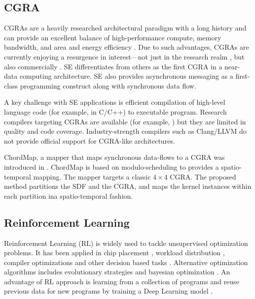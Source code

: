 \subsection{CGRA}
CGRAs are a heavily researched architectural paradigm with a long history and can provide an excellent balance of high-performance compute, memory bandwidth, and area and energy efficiency \cite{theodoridis2007survey}.
Due to such advantages, CGRAs are currently enjoying a resurgence in interest—not just in the research realm \cite{prabhakar2018plasticine}, but also commercially \cite{morgan2018intel, nicol2017coarse, vissers2019versal}.
SE differentiates from others as the first CGRA in a near-data computing architecture.
SE also provides asynchronous messaging as a first-class programming construct along with synchronous data flow. 

A key challenge with SE applications is efficient compilation of high-level language code (for example, in C/C++) to executable program. 
Research compilers targeting CGRAs are available (for example, \cite{adriaansen2016code, chin2017cgra, mei2003exploiting, prabhakar2018plasticine}) but they are limited in quality and code coverage. 
Industry-strength compilers such as Clang/LLVM do not provide official support for CGRA-like architectures.

ChordMap, a mapper that maps synchronous data-flows to a CGRA was introduced in \cite{li_chordmap_2022}.
ChordMap is based on modulo-scheduling to provides a spatio-temporal mapping.
The mapper targets a classic $4\times4$ CGRA.
The proposed method partitions the SDF and the CGRA, and maps the kernel instances within each partition ina spatio-temporal fashion.



\subsection{Reinforcement Learning}
Reinforcement Learning (RL) is widely used to tackle unsupervised optimization problems.
It has been applied in chip placement \cite{mirhoseini2020chip}, workload distribution \cite{Mirhoseini_placementRNN, addanki2019placeto, zhou2019gdp}, compiler optimizations \cite{Zhou_compileGNN} and other decision based tasks \cite{kormushev2013reinforcement, ZophL16_NASRL}. 
Alternative optimization algorithms includes evolutionary strategies \cite{Zhichao_ESNAS} and bayesian optimization \cite{shi2020learned}. 
An advantage of RL approach is learning from a collection of programs and reuse previous data for new programs by training a Deep Learning model \cite{zhou2019gdp}.

